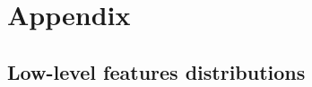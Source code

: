 \documentclass[../main/main.tex]{subfiles}
\begin{document}
\section{Appendix}
\label{sec:appendix}

\subsection{Low-level features distributions}
\label{ssec:appendix_low_features}

    
\end{document}
